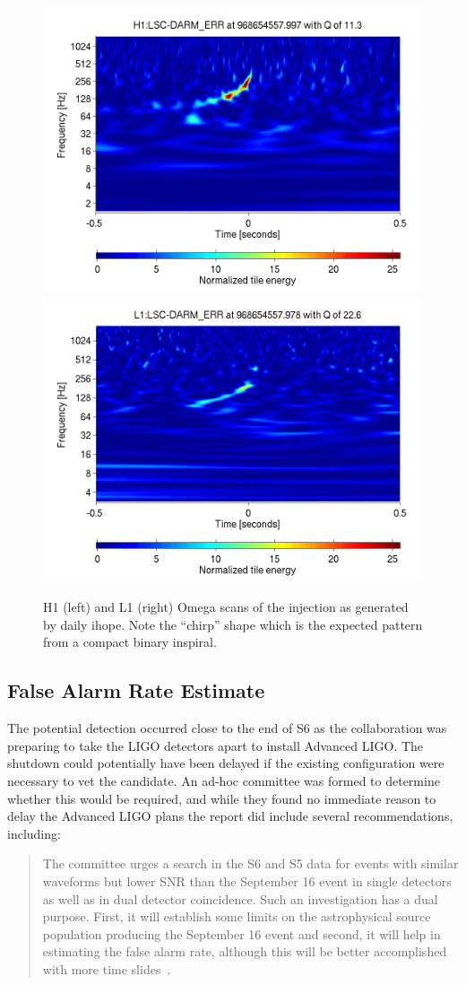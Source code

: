 \begin{figure}
  \includegraphics[width=0.5\linewidth]{figures/detchar/968654557_997314453_H1_LSC-DARM_ERR_1_00_spectrogram_whitened.png}
  \includegraphics[width=0.5\linewidth]{figures/detchar/968654557_978027343_L1_LSC-DARM_ERR_1_00_spectrogram_whitened.png}
  \caption[Omega scans of the injection]{
  \label{f:daily_ihope_dog_omega}
H1 (left) and L1 (right) Omega scans of the injection as
generated by daily ihope.  Note the ``chirp'' shape which is the
expected pattern from a compact binary inspiral.}
\end{figure}%


\subsection{False Alarm Rate Estimate}

The potential detection occurred close to the end of S6 as the
collaboration was preparing to take the LIGO detectors apart 
to install Advanced LIGO.  The shutdown could potentially have been
delayed if the existing configuration were necessary to vet
the candidate.  An ad-hoc committee was formed to determine whether
this would be required, and while they found no immediate reason to
delay the Advanced LIGO plans the report did include several
recommendations, including:


\begin{quote}
The committee urges a search in the S6 and S5 data for events with
similar waveforms but lower SNR than the September 16 event in single
detectors as well as in dual detector coincidence. Such an
investigation has a dual purpose. First, it will establish some limits
on the astrophysical source population producing the September 16
event and second, it will help in estimating the false alarm rate,
although this will be better accomplished with more time
slides~\cite{Weiss:injection}.
\end{quote}

